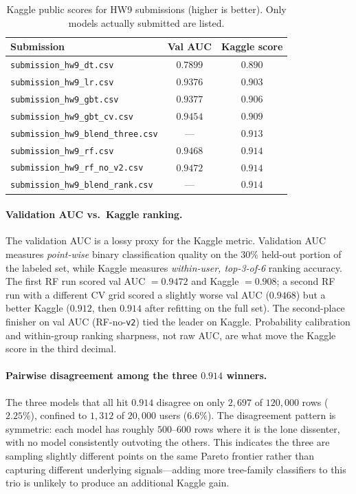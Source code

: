 \documentclass[12pt]{article}
\begin{document}
	\begin{table}[H]
		\centering
		\caption{Kaggle public scores for HW9 submissions (higher is better). Only models actually submitted are listed.}\label{tab:kaggle}
		\begin{tabular}{lcc}
			\toprule
			Submission & Val AUC & Kaggle score \\
			\midrule
			\texttt{submission\_hw9\_dt.csv}              & $0.7899$ & $0.890$ \\
			\texttt{submission\_hw9\_lr.csv}              & $0.9376$ & $0.903$ \\
			\texttt{submission\_hw9\_gbt.csv}             & $0.9377$ & $0.906$ \\
			\texttt{submission\_hw9\_gbt\_cv.csv}         & $0.9454$ & $0.909$ \\
			\texttt{submission\_hw9\_blend\_three.csv}    & --- & $0.913$ \\
			\texttt{submission\_hw9\_rf.csv}              & $0.9468$ & $\mathbf{0.914}$ \\
			\texttt{submission\_hw9\_rf\_no\_v2.csv}      & $\mathbf{0.9472}$ & $\mathbf{0.914}$ \\
			\texttt{submission\_hw9\_blend\_rank.csv}     & --- & $\mathbf{0.914}$ \\
			\bottomrule
		\end{tabular}
	\end{table}

	\paragraph{Validation AUC vs.\ Kaggle ranking.} The validation AUC is a lossy proxy for the Kaggle metric. Validation AUC measures \emph{point-wise} binary classification quality on the 30\% held-out portion of the labeled set, while Kaggle measures \emph{within-user, top-3-of-6} ranking accuracy. The first RF run scored val AUC $=0.9472$ and Kaggle $=0.908$; a second RF run with a different CV grid scored a slightly worse val AUC ($0.9468$) but a better Kaggle ($0.912$, then $0.914$ after refitting on the full set). The second-place finisher on val AUC (RF-no-\texttt{v2}) tied the leader on Kaggle. Probability calibration and within-group ranking sharpness, not raw AUC, are what move the Kaggle score in the third decimal.

	\paragraph{Pairwise disagreement among the three $0.914$ winners.} The three models that all hit $0.914$ disagree on only $2{,}697$ of $120{,}000$ rows ($2.25\%$), confined to $1{,}312$ of $20{,}000$ users ($6.6\%$). The disagreement pattern is symmetric: each model has roughly $500$--$600$ rows where it is the lone dissenter, with no model consistently outvoting the others. This indicates the three are sampling slightly different points on the same Pareto frontier rather than capturing different underlying signals---adding more tree-family classifiers to this trio is unlikely to produce an additional Kaggle gain.
\end{document}
